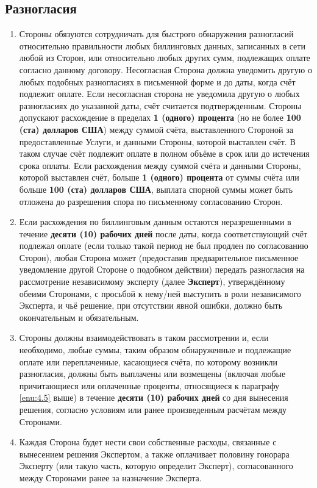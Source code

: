 \begin{Form}
    \section{Разногласия}\label{sec:5}
     \begin{enumerate}[label=\thesection.\arabic*.]
      \item Стороны обязуются сотрудничать для быстрого обнаружения разногласий относительно правильности любых биллинговых
            данных, записанных в сети любой из Сторон, или относительно любых других сумм, подлежащих оплате согласно данному
            договору. Несогласная Сторона должна уведомить другую о любых подобных разногласиях в письменной форме и до даты,
            когда счёт подлежит оплате. Если несогласная сторона не уведомила другую о любых разногласиях до указанной даты,
            счёт считается подтвержденным.
            Стороны допускают расхождение в пределах \textbf{1 (одного) процента} (но не более \textbf{100 (ста) долларов США})
            между суммой счёта, выставленного Стороной  за предоставленные Услуги, и данными Стороны, которой
            выставлен счёт. В таком случае счёт подлежит оплате в полном объёме в срок или до истечения срока оплаты.
            Если расхождения между суммой счёта и данными Стороны, которой выставлен счёт, больше \textbf{1 (одного)
            процента} от суммы счёта или больше \textbf{100 (ста) долларов США}, выплата спорной суммы может быть отложена
            до разрешения спора по письменному согласованию Сторон.
      \item Если расхождения по биллинговым данным остаются неразрешенными в течение \textbf{десяти (10) рабочих дней} после даты,
            когда соответствующий счёт подлежал оплате (если только такой период не был продлен по согласованию Сторон),
            любая Сторона  может (предоставив предварительное письменное уведомление другой Стороне о подобном действии) передать
            разногласия на рассмотрение независимому эксперту (далее \textbf{\flqq{}Эксперт\frqq}), утверждённому обеими Сторонами,
            с просьбой к нему/ней выступить в роли независимого Эксперта, и чьё решение, при отсутствии явной ошибки,
            должно быть окончательным и обязательным.
      \item Стороны  должны взаимодействовать в таком рассмотрении и, если необходимо, любые суммы, таким образом обнаруженные и
            подлежащие оплате или переплаченные, касающиеся счёта, по которому возникли разногласия, должны быть выплачены или
            возмещены (включая любые причитающиеся или оплаченные проценты, относящиеся к параграфу \ref{enu:4.5} выше)
            в течение \textbf{десяти (10) рабочих дней} со дня вынесения решения, согласно условиям или ранее произведенным
            расчётам между Сторонами.
      \item Каждая Сторона  будет нести свои собственные расходы, связанные с вынесением решения Экспертом, а также оплачивает половину гонорара
           Эксперту (или такую часть, которую определит Эксперт), согласованного между Сторонами  ранее за назначение Эксперта.
     \end{enumerate}



\end{Form}
